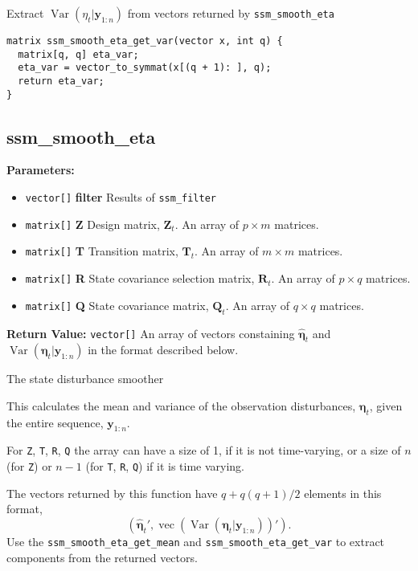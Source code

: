 \documentclass[]{book}
\providecommand{\tightlist}{%
  \setlength{\itemsep}{0pt}\setlength{\parskip}{0pt}}
\DeclareMathOperator{\Var}{Var}
\DeclareMathOperator{\VEC}{vec}
\newcommand{\mat}[1]{\boldsymbol{#1}}
\renewcommand{\vec}[1]{\boldsymbol{#1}}
\begin{document}
Extract \(\Var(\eta_t|\vec{y}_{1:n})\) from vectors returned by
\texttt{ssm\_smooth\_eta}

\begin{verbatim}
matrix ssm_smooth_eta_get_var(vector x, int q) {
  matrix[q, q] eta_var;
  eta_var = vector_to_symmat(x[(q + 1): ], q);
  return eta_var;
}
\end{verbatim}

\subsection{ssm\_smooth\_eta}\label{ssmux5fsmoothux5feta-1}

\textbf{Parameters:}

\begin{itemize}
\tightlist
\item
  \texttt{vector{[}{]}} \textbf{filter} Results of \texttt{ssm\_filter}
\item
  \texttt{matrix{[}{]}} \textbf{Z} Design matrix, \(\mat{Z}_t\). An
  array of \(p \times m\) matrices.
\item
  \texttt{matrix{[}{]}} \textbf{T} Transition matrix, \(\mat{T}_t\). An
  array of \(m \times m\) matrices.
\item
  \texttt{matrix{[}{]}} \textbf{R} State covariance selection matrix,
  \(\mat{R} _t\). An array of \(p \times q\) matrices.
\item
  \texttt{matrix{[}{]}} \textbf{Q} State covariance matrix,
  \(\mat{Q}_t\). An array of \(q \times q\) matrices.
\end{itemize}

\textbf{Return Value:} \texttt{vector{[}{]}} An array of vectors
constaining \(\hat{\vec{\eta}}_t\) and
\(\Var(\vec{\eta}_t | \vec{y}_{1:n})\) in the format described below.

The state disturbance smoother

This calculates the mean and variance of the observation disturbances,
\(\vec{\eta}_t\), given the entire sequence, \(\vec{y}_{1:n}\).

For \texttt{Z}, \texttt{T}, \texttt{R}, \texttt{Q} the array can have a
size of 1, if it is not time-varying, or a size of \(n\) (for
\texttt{Z}) or \(n - 1\) (for \texttt{T}, \texttt{R}, \texttt{Q}) if it
is time varying.

The vectors returned by this function have \(q + q (q + 1) / 2\)
elements in this format, \[
(\hat{\vec{\eta}}_t', \VEC(\Var(\vec{\eta}_t | \vec{y}_{1:n}))' ).
\] Use the \texttt{ssm\_smooth\_eta\_get\_mean} and
\texttt{ssm\_smooth\_eta\_get\_var} to extract components from the
returned vectors.
\end{document}
